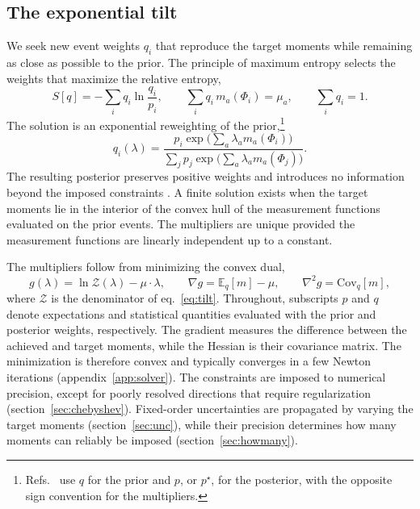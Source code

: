 
\subsection{The exponential tilt}
\label{sec:tilt}

We seek new event weights $q_i$ that reproduce the target moments while remaining as close as possible to the prior. The principle of maximum entropy \cite{Kullback:1951,Jaynes:1957} selects the weights that maximize the relative entropy,
\begin{equation}
S[q]=-\sum_i q_i\ln\frac{q_i}{p_i},
\qquad
\sum_i q_i\,m_a(\Phi_i)=\mu_a,
\qquad
\sum_i q_i=1 .
\label{eq:entropy}
\end{equation}
The solution is an exponential reweighting of the prior,\footnote{Refs.~\cite{Assi:2025ibi,Assi:2026tfh} use $q$ for the prior and $p$, or $p^\star$, for the posterior, with the opposite sign convention for the multipliers.}
\begin{equation}
q_i(\lambda)=
\frac{p_i\exp\big(\sum_a\lambda_a m_a(\Phi_i)\big)}
{\sum_j p_j\exp\big(\sum_a\lambda_a m_a(\Phi_j)\big)}.
\label{eq:tilt}
\end{equation}
The resulting posterior preserves positive weights and introduces no information beyond the imposed constraints \cite{Shore:1980}. A finite solution exists when the target moments lie in the interior of the convex hull of the measurement functions evaluated on the prior events. The multipliers are unique provided the measurement functions are linearly independent up to a constant.

The multipliers follow from minimizing the convex dual,
\begin{equation}
g(\lambda)=\ln\mathcal{Z}(\lambda)-\mu\cdot\lambda,
\qquad
\nabla g=\mathbb{E}_q[m]-\mu,
\qquad
\nabla^2g=\mathrm{Cov}_q[m],
\label{eq:dual}
\end{equation}
where $\mathcal{Z}$ is the denominator of eq.~\eqref{eq:tilt}. Throughout, subscripts $p$ and $q$ denote expectations and statistical quantities evaluated with the prior and posterior weights, respectively. The gradient measures the difference between the achieved and target moments, while the Hessian is their covariance matrix. The minimization is therefore convex and typically converges in a few Newton iterations (appendix~\ref{app:solver}). The constraints are imposed to numerical precision, except for poorly resolved directions that require regularization (section~\ref{sec:chebyshev}). Fixed-order uncertainties are propagated by varying the target moments (section~\ref{sec:unc}), while their precision determines how many moments can reliably be imposed (section~\ref{sec:howmany}).


